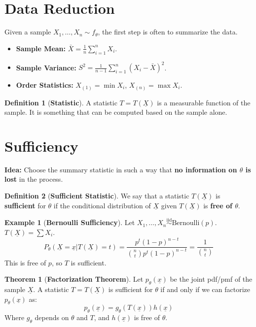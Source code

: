 \documentclass[12pt, a4paper]{article}
\theoremstyle{definition}
\newtheorem{definition}{Definition}
\newtheorem{example}{Example}
\newtheorem{theorem}{Theorem}
\newcommand{\iid}{\overset{\text{iid}}{\sim}}
\newcommand{\xvec}{\underline{x}}
\newcommand{\Xvec}{\underline{X}}
\begin{document}
\section{Data Reduction}
Given a sample $X_1, \dots, X_n \sim f_\theta$, the first step is often to summarize the data.
\begin{itemize}
    \item \textbf{Sample Mean:} $\bar{X} = \frac{1}{n}\sum_{i=1}^n X_i$.
    \item \textbf{Sample Variance:} $S^2 = \frac{1}{n-1}\sum_{i=1}^n (X_i - \bar{X})^2$.
    \item \textbf{Order Statistics:} $X_{(1)} = \min X_i$, $X_{(n)} = \max X_i$.
\end{itemize}

\begin{definition}[\textbf{Statistic}]
A statistic $T = T(\Xvec)$ is a measurable function of the sample. It is something that can be computed based on the sample alone.
\end{definition}

\section{Sufficiency}
\textbf{Idea:} Choose the summary statistic in such a way that \textbf{no information on $\theta$ is lost} in the process.

\begin{definition}[\textbf{Sufficient Statistic}]
We say that a statistic $T(\Xvec)$ is \textbf{sufficient} for $\theta$ if the conditional distribution of $\Xvec$ given $T(\Xvec)$ is \textbf{free of $\theta$}.
\end{definition}

\begin{example}[\textbf{Bernoulli Sufficiency}]
Let $X_1, \dots, X_n \iid \text{Bernoulli}(p)$. $T(\Xvec) = \sum X_i$.
$$ P_\theta(\Xvec = \xvec | T(\Xvec) = t) = \frac{p^t (1-p)^{n-t}}{\binom{n}{t} p^t (1-p)^{n-t}} = \frac{1}{\binom{n}{t}} $$
This is free of $p$, so $T$ is sufficient.
\end{example}

\begin{theorem}[\textbf{Factorization Theorem}]
Let $p_\theta(\xvec)$ be the joint pdf/pmf of the sample $\Xvec$. A statistic $T = T(\Xvec)$ is sufficient for $\theta$ if and only if we can factorize $p_\theta(\xvec)$ as:
$$ p_\theta(\xvec) = g_\theta(T(\xvec)) h(\xvec) $$
Where $g_\theta$ depends on $\theta$ and $T$, and $h(\xvec)$ is free of $\theta$.
\end{theorem}
\end{document}
